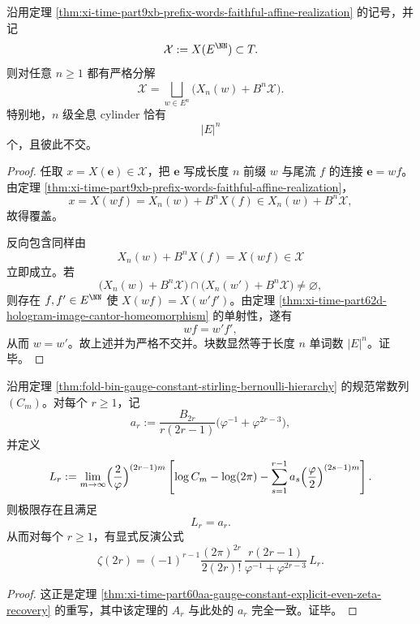 \begin{corollary}[全息像集的严格自仿射分解与精确分支数]\label{cor:xi-time-part9xb-holographic-image-strict-self-affine-decomposition}
沿用定理 \ref{thm:xi-time-part9xb-prefix-words-faithful-affine-realization} 的记号，并记
\[
\mathcal X:=X(E^{\NN})\subset T.
\]
则对任意 \(n\ge 1\) 都有严格分解
\[
\mathcal X=\bigsqcup_{w\in E^n}\bigl(X_n(w)+B^n\mathcal X\bigr).
\]
特别地，\(n\) 级全息 cylinder 恰有
\[
|E|^n
\]
个，且彼此不交。
\end{corollary}
\begin{proof}
任取 \(x=X(\mathbf e)\in \mathcal X\)，把 \(\mathbf e\) 写成长度 \(n\) 前缀 \(w\) 与尾流 \(f\) 的连接 \(\mathbf e=wf\)。由定理
\ref{thm:xi-time-part9xb-prefix-words-faithful-affine-realization}，
\[
x=X(wf)=X_n(w)+B^nX(f)\in X_n(w)+B^n\mathcal X,
\]
故得覆盖。

反向包含同样由
\[
X_n(w)+B^nX(f)=X(wf)\in \mathcal X
\]
立即成立。若
\[
\bigl(X_n(w)+B^n\mathcal X\bigr)\cap
\bigl(X_n(w')+B^n\mathcal X\bigr)\neq\varnothing,
\]
则存在 \(f,f'\in E^{\NN}\) 使 \(X(wf)=X(w'f')\)。由定理
\ref{thm:xi-time-part62d-hologram-image-cantor-homeomorphism} 的单射性，遂有
\[
wf=w'f',
\]
从而 \(w=w'\)。故上述并为严格不交并。块数显然等于长度 \(n\) 单词数 \(|E|^n\)。证毕。
\end{proof}

\begin{theorem}\label{thm:xi-time-part9xb-gauge-constants-recover-even-zeta}
沿用定理 \ref{thm:fold-bin-gauge-constant-stirling-bernoulli-hierarchy} 的规范常数列 \((C_m)\)。对每个 \(r\ge 1\)，记
\[
a_r:=
\frac{B_{2r}}{r(2r-1)}
\bigl(\varphi^{-1}+\varphi^{2r-3}\bigr),
\]
并定义
\[
L_r:=
\lim_{m\to\infty}
\Bigl(\frac{2}{\varphi}\Bigr)^{(2r-1)m}
\left[
\log C_m-\log(2\pi)-\sum_{s=1}^{r-1}a_s
\Bigl(\frac{\varphi}{2}\Bigr)^{(2s-1)m}
\right].
\]
则极限存在且满足
\[
L_r=a_r.
\]
从而对每个 \(r\ge 1\)，有显式反演公式
\[
\zeta(2r)
=
(-1)^{r-1}\frac{(2\pi)^{2r}}{2(2r)!}\,
\frac{r(2r-1)}{\varphi^{-1}+\varphi^{2r-3}}\,
L_r.
\]
\end{theorem}
\begin{proof}
这正是定理 \ref{thm:xi-time-part60aa-gauge-constant-explicit-even-zeta-recovery} 的重写，其中该定理的 \(A_r\) 与此处的 \(a_r\) 完全一致。证毕。
\end{proof}

